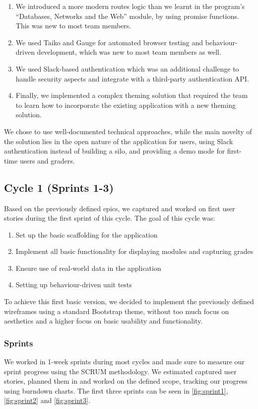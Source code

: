 \begin{enumerate}
	\item We introduced a more modern routes logic than we learnt in the program's ``Databases, Networks and the Web'' module, by using promise functions. This was new to most team members.
	\item We used Taiko and Gauge for automated browser testing and behaviour-driven development, which was new to most team members as well.
	\item We used Slack-based authentication which was an additional challenge to handle security aspects and integrate with a third-party authentication API.
	\item Finally, we implemented a complex theming solution that required the team to learn how to incorporate the existing application with a new theming solution.
\end{enumerate}

We chose to use well-documented technical approaches, while the main novelty of the solution lies in the open nature of the application for users, using Slack authentication instead of building a silo, and providing a demo mode for first-time users and graders.


\subsection{Cycle 1 (Sprints 1-3)}\label{sec:cycle1}
Based on the previously defined epics, we captured and worked on first user stories during the first sprint of this cycle. The goal of this cycle was:

\begin{enumerate}
    \item Set up the basic scaffolding for the application
    \item Implement all basic functionality for displaying modules and capturing grades
    \item Ensure use of real-world data in the application
    \item Setting up behaviour-driven unit tests
\end{enumerate}

To achieve this first basic version, we decided to implement the previously defined wireframes using a standard Bootstrap theme, without too much focus on aesthetics and a higher focus on basic usability and functionality.

\subsubsection{Sprints}
We worked in 1-week sprints during most cycles and made sure to measure our sprint progress using the SCRUM methodology. We estimated captured user stories, planned them in and worked on the defined scope, tracking our progress using burndown charts. The first three sprints can be seen in \cref{fig:sprint1}, \cref{fig:sprint2} and \cref{fig:sprint3}. 

